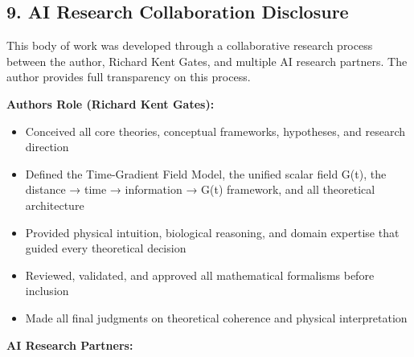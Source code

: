 \documentclass[
  10pt,
]{article}
\providecommand{\tightlist}{%
  \setlength{\itemsep}{0pt}\setlength{\parskip}{0pt}}
\begin{document}
\hypertarget{ai-research-collaboration-disclosure}{%
\subsection{9. AI Research Collaboration
Disclosure}\label{ai-research-collaboration-disclosure}}

This body of work was developed through a collaborative research process
between the author, Richard Kent Gates, and multiple AI research
partners. The author provides full transparency on this process.

\textbf{Author\textquotesingle s Role (Richard Kent Gates):}

\begin{itemize}
\tightlist
\item
  Conceived all core theories, conceptual frameworks, hypotheses, and
  research direction
\item
  Defined the Time-Gradient Field Model, the unified scalar field G(t),
  the distance → time → information → G(t) framework, and all
  theoretical architecture
\item
  Provided physical intuition, biological reasoning, and domain
  expertise that guided every theoretical decision
\item
  Reviewed, validated, and approved all mathematical formalisms before
  inclusion
\item
  Made all final judgments on theoretical coherence and physical
  interpretation
\end{itemize}

\textbf{AI Research Partners:}
\end{document}
